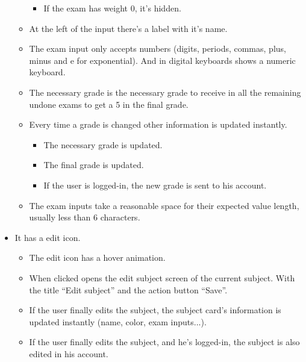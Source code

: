 \begin{itemize}[leftmargin=2cm]
\begin{itemize}[leftmargin=2cm]
\begin{itemize}[leftmargin=2cm]
            \item[\nextTask{}\label{req:x}] If the exam has weight 0, it's hidden.
        \end{itemize}
        \item[\nextTask{}\label{req:x}] At the left of the input there's a label with it's name.
        \item[\nextTask{}\label{req:x}] The exam input only accepts numbers (digits, periods, commas, plus, minus and e for exponential). And in digital keyboards shows a numeric keyboard.
        \item[\nextTask{}\label{req:x}] The necessary grade is the necessary grade to receive in all the remaining undone exams to get a 5 in the final grade.
        \item[\nextTask{}\label{req:x}] Every time a grade is changed other information is updated instantly.
        \begin{itemize}[leftmargin=2cm]
            \item[\nextTask{}\label{req:x}] The necessary grade is updated.
            \item[\nextTask{}\label{req:x}] The final grade is updated.
            \item[\nextTask{}\label{req:x}] If the user is logged-in, the new grade is sent to his account.
        \end{itemize}
        \item[\nextTask{}\label{req:x}] The exam inputs take a reasonable space for their expected value length, usually less than 6 characters.
    \end{itemize}
    \item[\nextTask{}\label{req:x}] It has a edit icon.
    \begin{itemize}[leftmargin=2cm]
        \item[\nextTask{}\label{req:x}] The edit icon has a hover animation.
        \item[\nextTask{}\label{req:x}] When clicked opens the edit subject screen of the current subject. With the title ``Edit subject'' and the action button ``Save''.
        \item[\nextTask{}\label{req:x}] If the user finally edits the subject, the subject card's information is updated instantly (name, color, exam inputs...).
        \item[\nextTask{}\label{req:x}] If the user finally edits the subject, and he's logged-in, the subject is also edited in his account.

\end{itemize}
\end{itemize}
